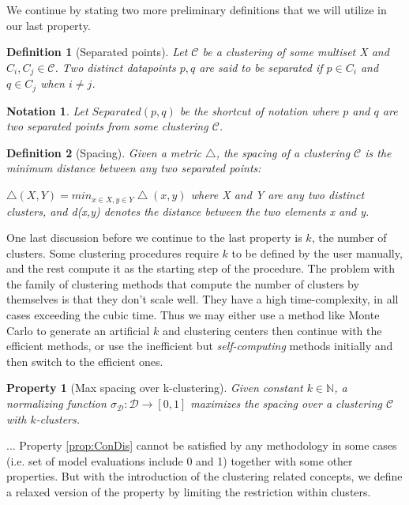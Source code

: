 \documentclass{article}
\newtheorem{definition}{Definition}
\newtheorem{property}{Property}
\newtheorem{notation}{Notation}
\newcommand{\nat}{\mathbb{N}}   %
\newcommand{\dataset}{\mathcal{D}}   %
\newcommand{\clusterset}{\mathcal{C}}   %
\begin{document}
We continue by stating two more preliminary definitions that we will utilize in our last property. 


\begin{definition} [Separated points] 
Let $\clusterset$ be a clustering of some multiset X and $C_i, C_j \in \clusterset$. Two distinct datapoints $p, q$ are said to be separated if $p \in C_i$ and  $q \in C_j$ when $i \neq j$. 
\end{definition}

\begin{notation} 
Let $Separated(p,q)$ be the shortcut of notation where $p$ and $q$ are two separated points from some clustering $\clusterset$.
\end{notation}

\begin{definition} [Spacing] 
Given a metric $\bigtriangleup$, the spacing of a clustering $\clusterset$ is the minimum distance between any two separated points:

$\bigtriangleup(X, Y) = min_{x\in X, y\in Y} \bigtriangleup(x,y)    $	%
where X and Y are any two distinct clusters, and d(x,y) denotes the distance between the two elements x and y.

\end{definition}

One last discussion before we continue to the last property is $k$, the number of clusters. Some clustering procedures require $k$ to be defined by the user manually, and the rest compute it as the starting step of the procedure. The problem with the family of clustering methods that compute the number of clusters by themselves is that they don't scale well. They have a high time-complexity, in all cases exceeding the cubic time. Thus we may either use a method like Monte Carlo to generate an artificial $k$ and clustering centers then continue with the efficient methods, or use the inefficient but \textit{self-computing} methods initially and then switch to the efficient ones.


\begin{property} [Max spacing over k-clustering]  Given constant $k \in \nat$, a normalizing function $\sigma_{\dataset}: \dataset  \rightarrow  [0,1]$  maximizes the spacing over a clustering $\clusterset$ with $k$-clusters.
\end{property}

... Property \ref{prop:ConDis} cannot be satisfied by any methodology in some cases (i.e. set of model evaluations include 0 and 1) together with some other properties. But with the introduction of the clustering related concepts, we define a relaxed version of the property by limiting the restriction within clusters.
\end{document}
